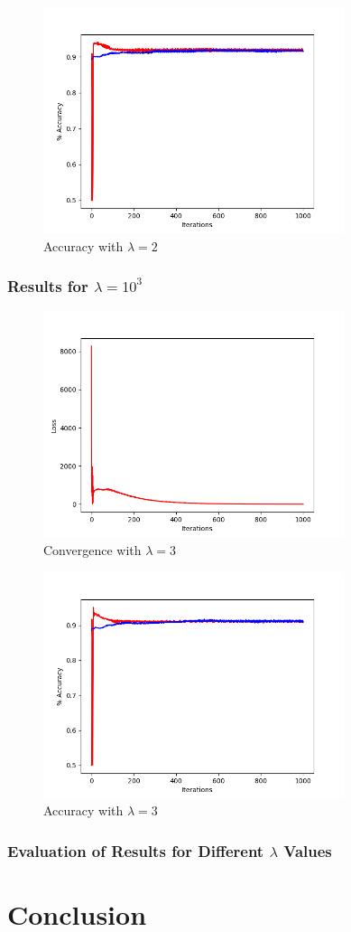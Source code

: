 \documentclass[letterpaper,10pt]{article}
\begin{document}
     \begin{figure}[ht]
    \centering
   \includegraphics[width=250pt]{L2-pos2-gradientLong.png}
     \caption{Accuracy with \(\lambda = 2\)}
    \label{fig:Plot of accuracy over iterations. Red is training data.}
    \end{figure}
\subsubsection{Results for \(\lambda = 10^{3}\)}
     \begin{figure}[ht]
    \centering
   \includegraphics[width=250pt]{L2-pos3-convergence.png}
    \caption{Convergence with \(\lambda = 3\)}
    \label{fig:Convergence of loss function over iterations}
    \end{figure}

     \begin{figure}[ht]
    \centering
   \includegraphics[width=250pt]{L2-pos3-gradientLong.png}
     \caption{Accuracy with \(\lambda = 3\)}
    \label{fig:Plot of accuracy over iterations. Red is training data.}
    \end{figure}

\subsubsection{Evaluation of Results for Different \(\lambda\) Values}

\section{Conclusion}
\end{document}
